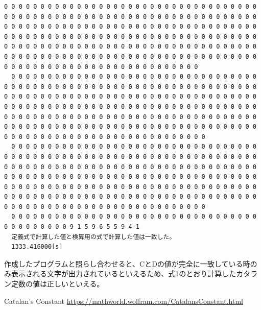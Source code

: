 \documentclass[a4j,dvipdfmx,titlepage]{jarticle}
\begin{document}
\begin{lstlisting}[caption=実行結果,label=kekka]
  0 0 0 0 0 0 0 0 0 0 0 0 0 0 0 0 0 0 0 0 0 0 0 0 0 0 0 0 0 0 0 0 0 0 0 0 0 0 0 0 0 0 0 0 0 0 0 0 0 0 0 0 0 0 0 0 0 0 0 0 0 0 0 0 0 0 0 0 0 0 0 0 0 0 0 0 0 0 0 0 0 0 0 0 0 0 0 0 0 0 0 0 0 0 0 0 0 0 0 0 0 0 0 0 0 0 0 0 0 0 0 0 0 0 0 0 0 0 0 0 0 0 0 0 0 0 0 0 0 0 0 0 0 0 0 0 0 0 0 0 0 0 0 0 0 0 0 0 0 0 0 0 0 0 0 0 0 0 0 0 0 0 0 0 0 0 0 0 0 0 0 0 0 0 0 0 0 0 0 0 0 0 0 0 0 0 0 0 0 0 0 0 0 0 0 0 0 0 0 0 0 0 0 0 0 0 0 0 0 0 0 0 0 0 0 0 0 0 0 0 0 0 0 0 0 0 0 0 0 0 0 0 0 0 0 0 0 
  0 0 0 0 0 0 0 0 0 0 0 0 0 0 0 0 0 0 0 0 0 0 0 0 0 0 0 0 0 0 0 0 0 0 0 0 0 0 0 0 0 0 0 0 0 0 0 0 0 0 0 0 0 0 0 0 0 0 0 0 0 0 0 0 0 0 0 0 0 0 0 0 0 0 0 0 0 0 0 0 0 0 0 0 0 0 0 0 0 0 0 0 0 0 0 0 0 0 0 0 0 0 0 0 0 0 0 0 0 0 0 0 0 0 0 0 0 0 0 0 0 0 0 0 0 0 0 0 0 0 0 0 0 0 0 0 0 0 0 0 0 0 0 0 0 0 0 0 0 0 0 0 0 0 0 0 0 0 0 0 0 0 0 0 0 0 0 0 0 0 0 0 0 0 0 0 0 0 0 0 0 0 0 0 0 0 0 0 0 0 0 0 0 0 0 0 0 0 0 0 0 0 0 0 0 0 0 0 0 0 0 0 0 0 0 0 0 0 0 0 0 0 0 0 0 0 0 0 0 0 0 0 0 0 0 0 0 
  0 0 0 0 0 0 0 0 0 0 0 0 0 0 0 0 0 0 0 0 0 0 0 0 0 0 0 0 0 0 0 0 0 0 0 0 0 0 0 0 0 0 0 0 0 0 0 0 0 0 0 0 0 0 0 0 0 0 0 0 0 0 0 0 0 0 0 0 0 0 0 0 0 0 0 0 0 0 0 0 0 0 0 0 0 0 0 0 0 0 0 0 0 0 0 0 0 0 0 0 0 0 0 0 0 0 0 0 0 0 0 0 0 0 0 0 0 0 0 0 0 0 0 0 0 0 0 0 0 0 0 0 0 0 0 0 0 0 0 0 0 0 0 0 0 0 0 0 0 0 0 0 0 0 0 0 0 0 0 0 0 0 0 0 0 0 0 0 0 0 0 0 0 0 0 0 0 0 0 0 0 0 0 0 0 0 0 0 0 0 0 0 0 0 0 0 0 0 0 0 0 0 0 0 0 0 0 0 0 0 0 0 0 0 0 0 0 0 0 0 0 0 0 0 0 0 0 0 0 0 0 0 0 0 0 0 0 
  0 0 0 0 0 0 0 0 0 0 0 0 0 0 0 0 0 0 0 0 0 0 0 0 0 0 0 0 0 0 0 0 0 0 0 0 0 0 0 0 0 0 0 9 1 5 9 6 5 5 9 4 1
  定義式で計算した値と検算用の式で計算した値は一致した。
  1333.416000[s]
\end{lstlisting}
作成したプログラムと照らし合わせると、CとDの値が完全に一致している時のみ表示される文字が出力されているといえるため、式1のとおり計算したカタラン定数の値は正しいといえる。
\begin{thebibliography}{99}
   Catalan's Constant \url{https://mathworld.wolfram.com/CatalansConstant.html}
\end{thebibliography}
\end{document}
